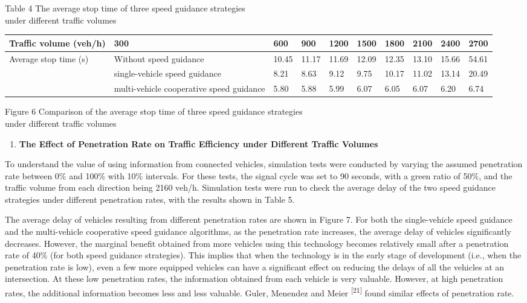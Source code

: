 Table 4 The average stop time of three speed guidance strategies\\
under different traffic volumes

\begin{longtable}[c]{@{}llllllllll@{}}
\toprule
Traffic volume (veh/h) & 300 & 600 & 900 & 1200 & 1500 & 1800 & 2100 &
2400 & 2700\tabularnewline
\midrule
\endhead
Average stop time (s) & Without speed guidance & 10.45 & 11.17 & 11.69 &
12.09 & 12.35 & 13.10 & 15.66 & 54.61\tabularnewline
& single-vehicle speed guidance & 8.21 & 8.63 & 9.12 & 9.75 & 10.17 &
11.02 & 13.14 & 20.49\tabularnewline
& multi-vehicle cooperative speed guidance & 5.80 & 5.88 & 5.99 & 6.07 &
6.05 & 6.07 & 6.20 & 6.74\tabularnewline
\bottomrule
\end{longtable}

Figure 6 Comparison of the average stop time of three speed guidance
strategies\\
under different traffic volumes

\begin{enumerate}
\def\labelenumi{\arabic{enumi}.}
\item
  \textbf{The Effect of Penetration Rate on Traffic Efficiency under
  Different Traffic Volumes}
\end{enumerate}

To understand the value of using information from connected vehicles,
simulation tests were conducted by varying the assumed penetration rate
between 0\% and 100\% with 10\% intervals. For these tests, the signal
cycle was set to 90 seconds, with a green ratio of 50\%, and the traffic
volume from each direction being 2160 veh/h. Simulation tests were run
to check the average delay of the two speed guidance strategies under
different penetration rates, with the results shown in Table 5.

The average delay of vehicles resulting from different penetration rates
are shown in Figure 7. For both the single-vehicle speed guidance and
the multi-vehicle cooperative speed guidance algorithms, as the
penetration rate increases, the average delay of vehicles significantly
decreases. However, the marginal benefit obtained from more vehicles
using this technology becomes relatively small after a penetration rate
of 40\% (for both speed guidance strategies). This implies that when the
technology is in the early stage of development (i.e., when the
penetration rate is low), even a few more equipped vehicles can have a
significant effect on reducing the delays of all the vehicles at an
intersection. At these low penetration rates, the information obtained
from each vehicle is very valuable. However, at high penetration rates,
the additional information becomes less and less valuable. Guler,
Menendez and Meier \textsuperscript{{[}21{]}} found similar effects of
penetration rate.

